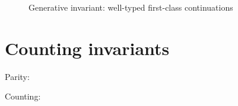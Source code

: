 \begin{figure}[tp]
\caption{Generative invariant: well-typed first-class continuations}
\label{fig:gen-letcc} 
\end{figure}


\section{Counting invariants}
\label{sec:gen-count}

Parity:

\bigskip
\noindent
Counting:





\label{sec:pointer-inequality}
